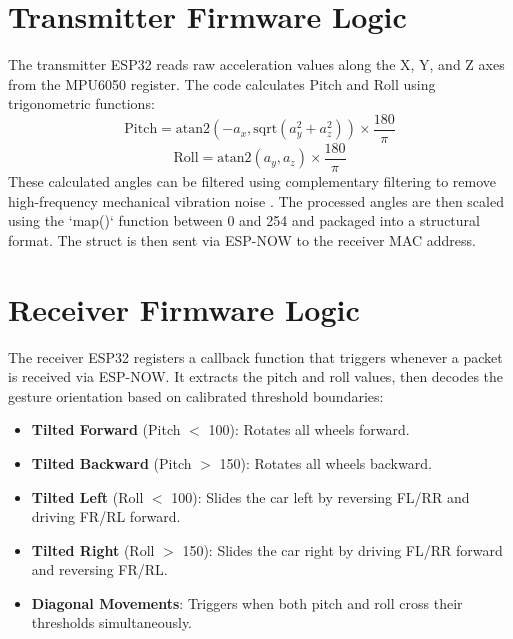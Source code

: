 \documentclass[12pt,a4paper,oneside]{report}
\begin{document}
\section{Transmitter Firmware Logic}
The transmitter ESP32 reads raw acceleration values along the X, Y, and Z axes from the MPU6050 register. The code calculates Pitch and Roll using trigonometric functions:
\begin{equation}
\text{Pitch} = \text{atan2}(-a_x, \text{sqrt}(a_y^2 + a_z^2)) \times \frac{180}{\pi}
\end{equation}
\begin{equation}
\text{Roll} = \text{atan2}(a_y, a_z) \times \frac{180}{\pi}
\end{equation}
These calculated angles can be filtered using complementary filtering to remove high-frequency mechanical vibration noise \cite{imu_filter}. The processed angles are then scaled using the `map()` function between 0 and 254 and packaged into a structural format. The struct is then sent via ESP-NOW to the receiver MAC address.

\section{Receiver Firmware Logic}
The receiver ESP32 registers a callback function that triggers whenever a packet is received via ESP-NOW. It extracts the pitch and roll values, then decodes the gesture orientation based on calibrated threshold boundaries:
\begin{itemize}[noitemsep,topsep=2pt,parsep=0pt,partopsep=0pt]
    \item \textbf{Tilted Forward} (Pitch $<$ 100): Rotates all wheels forward.
    \item \textbf{Tilted Backward} (Pitch $>$ 150): Rotates all wheels backward.
    \item \textbf{Tilted Left} (Roll $<$ 100): Slides the car left by reversing FL/RR and driving FR/RL forward.
    \item \textbf{Tilted Right} (Roll $>$ 150): Slides the car right by driving FL/RR forward and reversing FR/RL.
    \item \textbf{Diagonal Movements}: Triggers when both pitch and roll cross their thresholds simultaneously.
\end{itemize}
\end{document}
